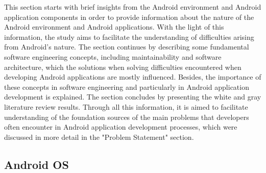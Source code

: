 This section starts with brief insights from the Android environment and Android application components in order to provide information about the nature of the Android environment and Android applications. With the light of this information, the study aims to facilitate the understanding of difficulties arising from Android's nature. The section continues by describing some fundamental software engineering concepts, including maintainability and software architecture, which the solutions when solving difficulties encountered when developing Android applications are mostly influenced. Besides, the importance of these concepts in software engineering and particularly in Android application development is explained. The section concludes by presenting the white and gray literature review results. Through all this information, it is aimed to facilitate understanding of the foundation sources of the main problems that developers often encounter in Android application development processes, which were discussed in more detail in the "Problem Statement" section. %
\subsection{Android OS}


%

%

%

%

